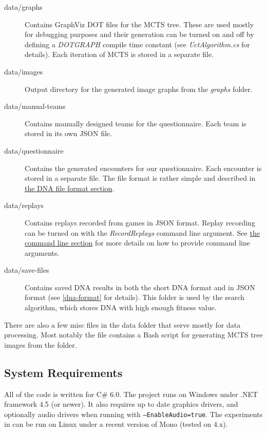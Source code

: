 \begin{description}
	\item[data/graphs] Contains GraphViz DOT \citep{graphviz} files for the MCTS tree. These are used mostly for debugging purposes and their generation can be turned on and off by defining a \emph{DOTGRAPH} compile time constant (see \emph{UctAlgorithm.cs} for details). Each iteration of MCTS is stored in a separate file.
	\item[data/images] Output directory for the generated image graphs from the \emph{graphs} folder.
	\item[data/manual-teams] Contains manually designed teams for the questionnaire. Each team is stored in its own JSON \citep{json} file.
	\item[data/questionnaire] Contains the generated encounters for our questionnaire. Each encounter is stored
	in a separate file. The file format is rather simple and described in \hyperref[dna-format]{the DNA file format section}.
	\item[data/replays] Contains replays recorded from games in JSON format. Replay recording can be turned on with the \emph{RecordReplays} command line argument. See \hyperref[cmd-args]{the command line section} for more details on how to provide command line arguments.
	\item[data/save-files] Contains saved DNA results in both the short DNA format and in JSON format (see \autoref{dna-format} for details). This folder is used by the search algorithm, which stores DNA with high enough fitness value.
\end{description}

There are also a few misc files in the data folder that serve mostly for data processing. Most notably the  file contains a Bash \citep{bash} script for generating MCTS tree images from the  folder.

\subsection{System Requirements}

All of the code is written for C\# 6.0. The  project runs on Windows under .NET framework 4.5 (or newer). It also requires up to date graphics drivers, and optionally audio drivers when running with \texttt{--EnableAudio=true}. The experiments in  can be run on Linux under a recent version of Mono (tested on 4.x).

